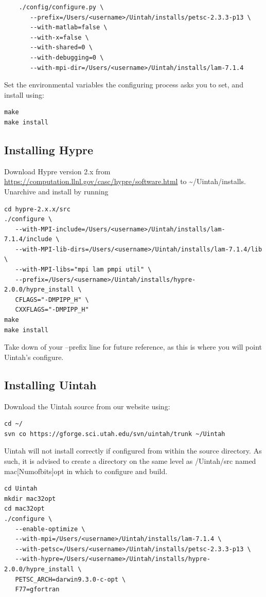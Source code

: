 \documentclass[12pt]{article}
\begin{document}
\begin{verbatim}
	./config/configure.py \
	   --prefix=/Users/<username>/Uintah/installs/petsc-2.3.3-p13 \
	   --with-matlab=false \
	   --with-x=false \
	   --with-shared=0 \
	   --with-debugging=0 \
	   --with-mpi-dir=/Users/<username>/Uintah/installs/lam-7.1.4
\end{verbatim}

Set the environmental variables the configuring process asks you to
set, and install using:

\begin{verbatim}
make
make install
\end{verbatim}

\subsection{Installing Hypre}
Download Hypre version 2.x from
\url{https://computation.llnl.gov/casc/hypre/software.html} to
\textasciitilde/Uintah/installs.  Unarchive and install by running

\begin{verbatim}
cd hypre-2.x.x/src
./configure \
   --with-MPI-include=/Users/<username>/Uintah/installs/lam-7.1.4/include \
   --with-MPI-lib-dirs=/Users/<username>/Uintah/installs/lam-7.1.4/lib \
   --with-MPI-libs="mpi lam pmpi util" \
   --prefix=/Users/<username>/Uintah/installs/hypre-2.0.0/hypre_install \
   CFLAGS="-DMPIPP_H" \
   CXXFLAGS="-DMPIPP_H" 
make
make install
\end{verbatim}

Take down of your --prefix line for future reference, as this is where
you will point Uintah's configure.

\subsection{Installing Uintah}
Download the Uintah source from our website using:

\begin{verbatim}
cd ~/
svn co https://gforge.sci.utah.edu/svn/uintah/trunk ~/Uintah
\end{verbatim}

Uintah will not install correctly if configured from within the source
directory.  As such, it is advised to create a directory on the same
level as /Uintah/src named mac[Numofbits]opt in which to configure and
build.

\begin{verbatim}
cd Uintah
mkdir mac32opt
cd mac32opt
./configure \
   --enable-optimize \
   --with-mpi=/Users/<username>/Uintah/installs/lam-7.1.4 \
   --with-petsc=/Users/<username>/Uintah/installs/petsc-2.3.3-p13 \
   --with-hypre=/Users/<username>/Uintah/installs/hypre-2.0.0/hypre_install \
   PETSC_ARCH=darwin9.3.0-c-opt \
   F77=gfortran
\end{verbatim}
\end{document}
